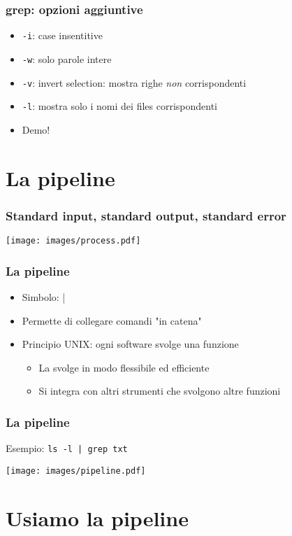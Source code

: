 \documentclass[xetex,table]{beamer}
\begin{document}
\begin{frame}
  \frametitle{grep: opzioni aggiuntive}
  \begin{itemize}
  \item \texttt{-i}: case insentitive
  \item \texttt{-w}: solo parole intere
  \item \texttt{-v}: invert selection: mostra righe {\em non} corrispondenti
  \item \texttt{-l}: mostra solo i nomi dei files corrispondenti
  \item Demo!
  \end{itemize}
\end{frame}

\section{La pipeline}

\begin{frame}
  \frametitle{Standard input, standard output, standard error}
  \begin{center}
    \texttt{[image: images/process.pdf]}
  \end{center}
\end{frame}

\begin{frame}
  \frametitle{La pipeline}
  \begin{itemize}
  \item Simbolo: |
  \item Permette di collegare comandi "in catena"
  \item Principio UNIX: ogni software svolge una funzione
    \begin{itemize}
    \item La svolge in modo flessibile ed efficiente
    \item Si integra con altri strumenti che svolgono altre funzioni
    \end{itemize}
  \end{itemize}
\end{frame}

\begin{frame}
  \frametitle{La pipeline}
  Esempio: \texttt{ls -l | grep txt}
  \begin{center}
    \texttt{[image: images/pipeline.pdf]}
  \end{center}
\end{frame}

\section{Usiamo la pipeline}
\end{document}
